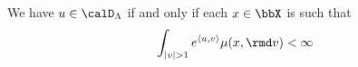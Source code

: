 \begin{lemma}
  \label{lemma:odeSpace-rationale}
  We have $\momentVar \in \odeSpace$ if and only if each $\stateVar \in \stateSpace$ is such that
  \begin{equation*}
    \int_{|\vecVar|>1} e^\prj{\momentVar}{\vecVar} \affJump(\stateVar, \rmd\markVar) < \infty
  \end{equation*}
\end{lemma}
